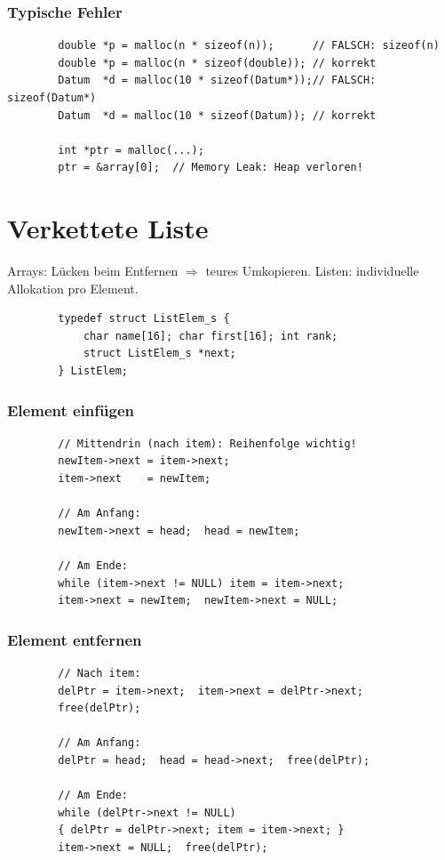 \documentclass[a4paper,9pt]{article}
\begin{document}
	\subsubsection{Typische Fehler}
	\begin{lstlisting}
		double *p = malloc(n * sizeof(n));      // FALSCH: sizeof(n)
		double *p = malloc(n * sizeof(double)); // korrekt
		Datum  *d = malloc(10 * sizeof(Datum*));// FALSCH: sizeof(Datum*)
		Datum  *d = malloc(10 * sizeof(Datum)); // korrekt
		
		int *ptr = malloc(...);
		ptr = &array[0];  // Memory Leak: Heap verloren!
	\end{lstlisting}
	
	\section{Verkettete Liste}
	
	\begin{tcolorbox}
		Arrays: Lücken beim Entfernen $\Rightarrow$ teures Umkopieren. Listen: individuelle Allokation pro Element.
	\end{tcolorbox}
	
	\begin{lstlisting}
		typedef struct ListElem_s {
			char name[16]; char first[16]; int rank;
			struct ListElem_s *next;
		} ListElem;
	\end{lstlisting}
	
	\subsubsection{Element einfügen}
	\begin{lstlisting}
		// Mittendrin (nach item): Reihenfolge wichtig!
		newItem->next = item->next;
		item->next    = newItem;
		
		// Am Anfang:
		newItem->next = head;  head = newItem;
		
		// Am Ende:
		while (item->next != NULL) item = item->next;
		item->next = newItem;  newItem->next = NULL;
	\end{lstlisting}
	
	\subsubsection{Element entfernen}
	\begin{lstlisting}
		// Nach item:
		delPtr = item->next;  item->next = delPtr->next;
		free(delPtr);
		
		// Am Anfang:
		delPtr = head;  head = head->next;  free(delPtr);
		
		// Am Ende:
		while (delPtr->next != NULL)
		{ delPtr = delPtr->next; item = item->next; }
		item->next = NULL;  free(delPtr);
	\end{lstlisting}
	
\end{document}
